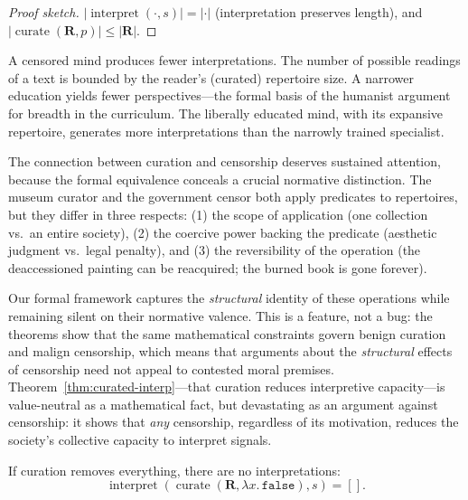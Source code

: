 \begin{proof}[Proof sketch]
$|\operatorname{interpret}(\cdot, s)| = |\cdot|$ (interpretation preserves
length), and $|\operatorname{curate}(\mathbf{R}, p)| \le |\mathbf{R}|$.
\end{proof}

A censored mind produces fewer interpretations.  The number of possible
readings of a text is bounded by the reader's (curated) repertoire size.
A narrower education yields fewer perspectives---the formal basis of the
humanist argument for breadth in the curriculum.  The liberally educated
mind, with its expansive repertoire, generates more interpretations than
the narrowly trained specialist.

\begin{remark}
\label{rem:censorship-political}
The connection between curation and censorship deserves sustained
attention, because the formal equivalence conceals a crucial normative
distinction.  The museum curator and the government censor both apply
predicates to repertoires, but they differ in three respects: (1) the
scope of application (one collection vs.\ an entire society), (2) the
coercive power backing the predicate (aesthetic judgment vs.\ legal
penalty), and (3) the reversibility of the operation (the deaccessioned
painting can be reacquired; the burned book is gone forever).

Our formal framework captures the \emph{structural} identity of these
operations while remaining silent on their normative valence.  This is
a feature, not a bug: the theorems show that the same mathematical
constraints govern benign curation and malign censorship, which means
that arguments about the \emph{structural} effects of censorship need
not appeal to contested moral premises.
Theorem~\ref{thm:curated-interp}---that curation reduces interpretive
capacity---is value-neutral as a mathematical fact, but devastating as
an argument against censorship: it shows that \emph{any} censorship,
regardless of its motivation, reduces the society's collective capacity
to interpret signals.
\end{remark}

\begin{theorem}
\label{thm:empty-curate-interp}
If curation removes everything, there are no interpretations:
\[
  \operatorname{interpret}(\operatorname{curate}(\mathbf{R},
  \lambda x.\, \texttt{false}), s) = [].
\]
\end{theorem}

